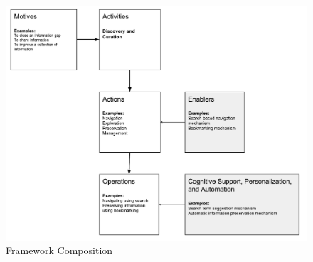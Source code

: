 \documentclass{sigchi}
\begin{document}
\begin{figure}[ht!]
	\noindent
	\centering
    \includegraphics[width=\linewidth]{figures/framework_overview.pdf}
	\caption{Framework Composition}
	\label{fig:framework_overview} 
\end{figure}
\end{document}
